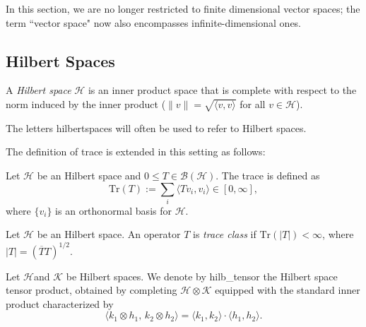 In this section, we are no longer restricted to finite dimensional vector spaces; the term ``vector space" now also encompasses infinite-dimensional ones.


\subsection{Hilbert Spaces}



\begin{definition}
  A \emph{Hilbert space} $\mathcal{H}$ is an inner product space that is complete with respect to the norm induced by the inner product (\ie  $\|v\| = \sqrt{\langle v, v \rangle}$ for all $v \in \mathcal{H}$).
\end{definition}

The letters \gls{hilbertspaces} will often be used to refer to Hilbert spaces.

The definition of trace is extended in this setting as follows:
\begin{definition}
  Let $\mathcal{H}$ be an Hilbert space and $0 \leq T \in \mathcal{B}(\mathcal{H})$. The trace is defined as 
\[
\text{Tr}(T) := \sum_i \langle T v_i, v_i \rangle \in [0, \infty],
\]
where $\{v_i\}$ is an orthonormal basis for $\mathcal{H}$.
\end{definition}

\begin{definition}
  Let $\mathcal{H}$ be an Hilbert space. An operator $T$ is \emph{trace class} if $\text{Tr}(|T|) < \infty$, where $|T|= \left(\overline{T}T \right)^{1/2}$.
\end{definition}

\begin{definition}
  Let \( \mathcal{H} \)and \( \mathcal{K} \) be Hilbert spaces. We denote by \gls{hilb_tensor} the Hilbert space tensor product, obtained by completing \( \mathcal{H}  \otimes \mathcal{K} \) equipped with the standard inner product characterized by
\[
\langle k_1 \otimes h_1,\, k_2 \otimes h_2 \rangle = \langle k_1, k_2 \rangle \cdot \langle h_1, h_2 \rangle.
\] 
\end{definition}


